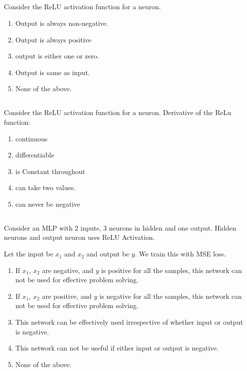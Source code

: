 \begin{frame}
\section{}
Consider the ReLU activation function for a neuron.

\begin{enumerate}[label=(\Alph*)]
\item Output is always non-negative.    %
\item Output is always positive
\item output is either one or zero.
\item Output is same as input.
\item None of the above.  %
\end{enumerate}
\end{frame}

\begin{frame}
\section{}
Consider the ReLU activation function for a neuron. Derivative of the ReLu function:
\begin{enumerate}[label=(\Alph*)]
\item continuous
\item differentiable
\item is Constant throughout
\item can take two values.    %
\item can never be negative   %
\end{enumerate}
\end{frame}

\begin{frame}
\section{}
Consider an MLP with 2 inputs, 3 neurons in hidden and one output. Hidden neurons and output neuron uses ReLU Activation.

Let the input be $x_1$ and $x_2$ and output be $y$. We train this with MSE loss.
\begin{enumerate}[label=(\Alph*)]
\item If $x_1$, $x_2$ are negative, and $y$ is positive for all the samples, this network can not be used for effective problem solving.
\item If $x_1$, $x_2$ are positive, and $y$ is negative for all the samples, this network can not be used for effective problem solving.    %
\item This network can be effectively used irrespective of whether input or output is negative.
\item This network can not be useful if either input or output is negative.
\item None of the above.  %
\end{enumerate}
\end{frame}


